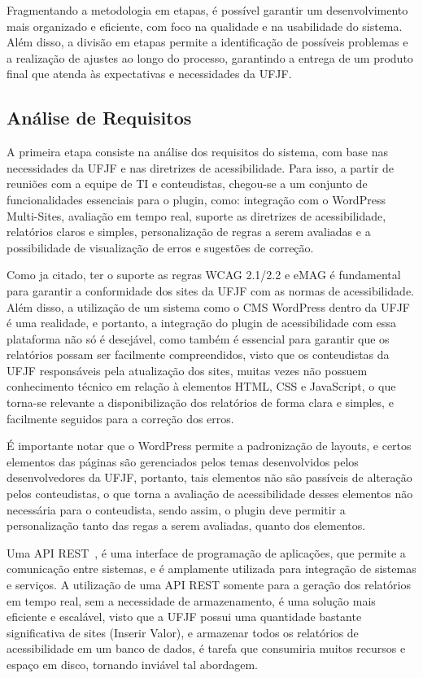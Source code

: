 \documentclass[12pt]{article}
\begin{document}
Fragmentando a metodologia em etapas, é possível garantir um desenvolvimento
mais organizado e eficiente, com foco na qualidade e na usabilidade do sistema.
Além disso, a divisão em etapas permite a identificação de possíveis problemas
e a realização de ajustes ao longo do processo, garantindo a entrega de um
produto final que atenda às expectativas e necessidades da UFJF\@.

\subsection{Análise de Requisitos}
A primeira etapa consiste na análise dos requisitos do sistema, com base nas
necessidades da UFJF e nas diretrizes de acessibilidade. Para isso, a partir
de reuniões com a equipe de TI e conteudistas, chegou-se a um conjunto de
funcionalidades essenciais para o plugin, como: integração com o WordPress
Multi-Sites, avaliação em tempo real, suporte as diretrizes de acessibilidade,
relatórios claros e simples, personalização de regras a serem avaliadas e a
possibilidade de visualização de erros e sugestões de correção.

Como ja citado, ter o suporte as regras WCAG 2.1/2.2 e eMAG é fundamental para
garantir a conformidade dos sites da UFJF com as normas de acessibilidade.
Além disso, a utilização de um sistema como o CMS WordPress dentro da UFJF
é uma realidade, e portanto, a integração do plugin de acessibilidade com
essa plataforma não só é desejável, como também é essencial para garantir
que os relatórios possam ser facilmente compreendidos, visto que os
conteudistas da UFJF responsáveis pela atualização dos sites, muitas
vezes não possuem conhecimento técnico em relação à elementos HTML,
CSS e JavaScript, o que torna-se relevante a disponibilização dos
relatórios de forma clara e simples, e facilmente seguidos para a
correção dos erros.

É importante notar que o WordPress permite a padronização de layouts,
e certos elementos das páginas são gerenciados pelos temas desenvolvidos pelos
desenvolvedores da UFJF, portanto, tais elementos não são passíveis de alteração
pelos conteudistas, o que torna a avaliação de acessibilidade desses elementos
não necessária para o conteudista, sendo assim, o plugin deve permitir a
personalização tanto das regas a serem avaliadas, quanto dos elementos.

Uma API REST~\autocite{api}, é uma interface de programação de aplicações, que
permite a comunicação entre sistemas, e é amplamente utilizada para integração
de sistemas e serviços. A utilização de uma API REST somente para a geração
dos relatórios em tempo real, sem a necessidade de armazenamento, é uma
solução mais eficiente e escalável, visto que a UFJF possui uma quantidade
bastante significativa de sites (Inserir Valor), e armazenar todos os
relatórios de acessibilidade em um banco de dados, é tarefa que consumiria
muitos recursos e espaço em disco, tornando inviável tal abordagem.
\end{document}
